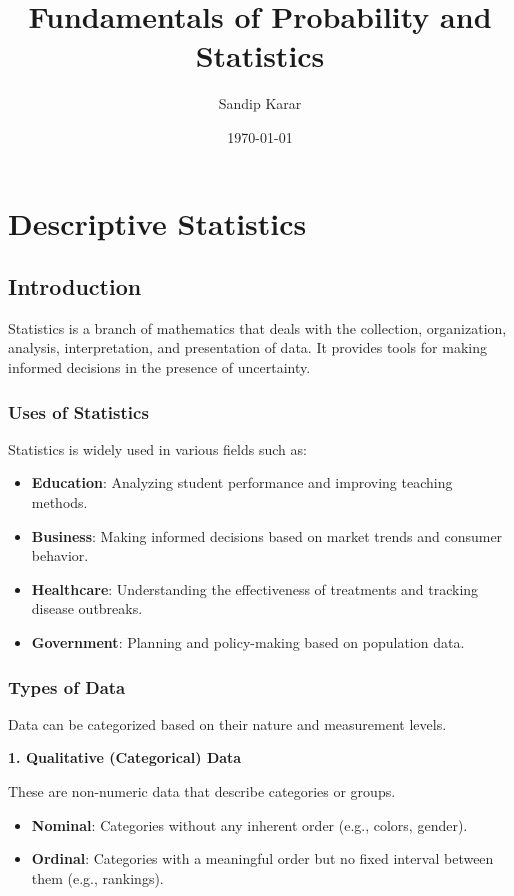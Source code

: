 \documentclass[twoside]{book}
\title{Fundamentals of Probability and Statistics}
\author{Sandip Karar}
\date{\today}
\begin{document}
\maketitle

\tableofcontents

\chapter{Descriptive Statistics}

\section{Introduction}
Statistics is a branch of mathematics that deals with the collection, organization, analysis, interpretation, and presentation of data. It provides tools for making informed decisions in the presence of uncertainty.

\subsection{Uses of Statistics}

Statistics is widely used in various fields such as:

\begin{itemize}
    \item \textbf{Education}: Analyzing student performance and improving teaching methods.
    \item \textbf{Business}: Making informed decisions based on market trends and consumer behavior.
    \item \textbf{Healthcare}: Understanding the effectiveness of treatments and tracking disease outbreaks.
    \item \textbf{Government}: Planning and policy-making based on population data.
\end{itemize}

\subsection{Types of Data}

Data can be categorized based on their nature and measurement levels.

\textbf{1. Qualitative (Categorical) Data}

These are non-numeric data that describe categories or groups.

\begin{itemize}
    \item \textbf{Nominal}: Categories without any inherent order (e.g., colors, gender).
    \item \textbf{Ordinal}: Categories with a meaningful order but no fixed interval between them (e.g., rankings).
\end{itemize}
\end{document}
